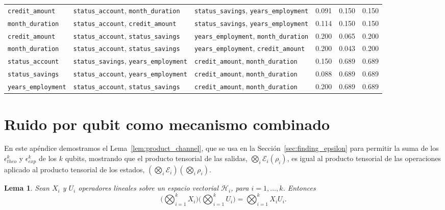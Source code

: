 \documentclass{ieeeaccess}
\newtheorem{lemma}{Lema}[section]
\begin{document}
\begin{table}[htbp]
\begin{tabular}{@{}lllrrr@{}}
  \texttt{credit\_amount} & \texttt{status\_account}, \texttt{month\_duration} & \texttt{status\_savings}, \texttt{years\_employment} & 0.091 & 0.150 & 0.150 \\
  \texttt{month\_duration} & \texttt{status\_account}, \texttt{credit\_amount} & \texttt{status\_savings}, \texttt{years\_employment} & 0.114 & 0.150 & 0.150 \\
  \texttt{credit\_amount} & \texttt{status\_account}, \texttt{status\_savings} & \texttt{years\_employment}, \texttt{month\_duration} & 0.200 & 0.065 & 0.200 \\
  \texttt{month\_duration} & \texttt{status\_account}, \texttt{status\_savings} & \texttt{years\_employment}, \texttt{credit\_amount} & 0.200 & 0.043 & 0.200 \\
  \texttt{status\_account} & \texttt{status\_savings}, \texttt{years\_employment} & \texttt{credit\_amount}, \texttt{month\_duration} & 0.150 & 0.689 & 0.689 \\
  \texttt{status\_savings} & \texttt{status\_account}, \texttt{years\_employment} & \texttt{credit\_amount}, \texttt{month\_duration} & 0.088 & 0.689 & 0.689 \\
  \texttt{years\_employment} & \texttt{status\_account}, \texttt{status\_savings} & \texttt{credit\_amount}, \texttt{month\_duration} & 0.200 & 0.689 & 0.689 \\
  \bottomrule
  \end{tabular}
\end{table}

\section{Ruido por qubit como mecanismo combinado}
\label{ap:composition_proof}

En este apéndice demostramos el Lema~\ref{lem:product_channel}, que se usa en la Sección~\ref{sec:finding_epsilon} para permitir la suma de los $\epsilon_{theo}^{k}$ y $\epsilon_{exp}^{k}$ de los $k$ qubits, mostrando que el producto tensorial de las salidas, $\bigotimes_i\mathcal{E}_i(\rho_i)$, es igual al producto tensorial de las operaciones aplicado al producto tensorial de los estados, $(\bigotimes_{i}\mathcal{E}_i)(\bigotimes_{i}\rho_i)$.

\begin{lemma}
  Sean $X_i$ y $U_i$ operadores lineales sobre un espacio vectorial $\mathcal{H}_i$, para $i = 1, \dots, k$. Entonces
  \[
    \Big(\bigotimes_{i=1}^{k} X_i\Big)\Big(\bigotimes_{i=1}^{k} U_i\Big) = \bigotimes_{i=1}^{k} X_i U_i.
  \]
  \label{lem:mixed_product}
\end{lemma}
\end{document}
